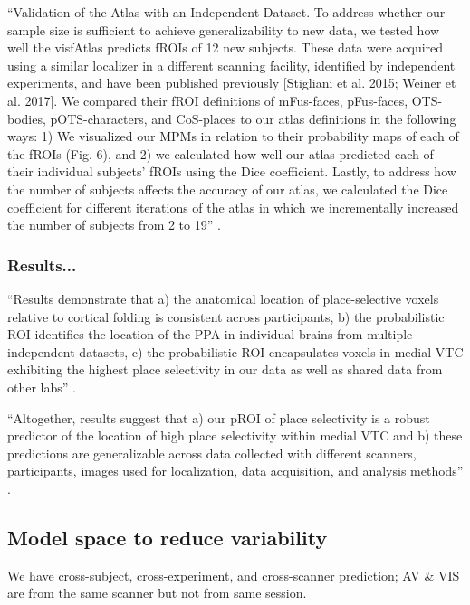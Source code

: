 ``Validation of the Atlas with an Independent Dataset.
%
To address whether our sample size is sufficient to achieve generalizability to
new data, we tested how well the visfAtlas predicts fROIs of 12 new subjects.
%
These data were acquired using a similar localizer in a different scanning
facility, identified by independent experiments, and have been published
previously [Stigliani et al.  2015; Weiner et al. 2017].
%
We compared their fROI definitions of mFus-faces, pFus-faces, OTS-bodies,
pOTS-characters, and CoS-places to our atlas definitions in the following
ways:
%
1) We visualized our MPMs in relation to their probability maps of
each of the fROIs (Fig. 6), and
%
2) we calculated how well our atlas predicted each of their individual
subjects' fROIs using the Dice coefficient.
%
Lastly, to address how the number of subjects affects the accuracy of our
atlas, we calculated the Dice coefficient for different iterations of the
atlas in which we incrementally increased the number of subjects from 2 to
19'' \citep{rosenke2021probabilistic}.


\subsubsection{Results...}


``Results demonstrate that
%
a) the anatomical location of place-selective voxels relative to cortical
folding is consistent across participants,
%
b) the probabilistic ROI identifies the location of the PPA in individual brains
from multiple independent datasets,
%
c) the probabilistic ROI encapsulates voxels in medial VTC exhibiting the
highest place selectivity in our data as well as shared data from other labs''
\citep{weiner2018defining}.

``Altogether, results suggest that
%
a) our pROI of place selectivity is a robust predictor of the location of high
place selectivity within medial VTC and
%
b) these predictions are generalizable across data collected with different
scanners, participants, images used for localization, data acquisition, and
analysis methods'' \citep{weiner2018defining}.


\subsection{Model space to reduce variability}

We have cross-subject, cross-experiment, and cross-scanner prediction; AV \& VIS
are from the same scanner but not from same session.


